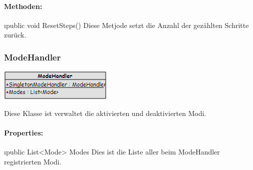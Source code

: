 \documentclass[../entwurf.tex]{subfiles}
\begin{document}
				\paragraph{Methoden:}
					\begin{itemize}
						\i{public void ResetSteps()} Diese Metjode setzt die Anzahl der gezählten Schritte zurück.
					\end{itemize}
			\subsubsection{ModeHandler}
				\begin{minipage}{0.45\textwidth}
					\includegraphics[width=\textwidth,height=\textheight,keepaspectratio]{../graphics/m_klassen/ModeHandler.png}
				\end{minipage}
				\begin{minipage}{0.55\textwidth}
					Diese Klasse ist verwaltet die aktivierten und deaktivierten Modi.
				\end{minipage}
				\paragraph{Properties:}
					\begin{itemize}
						\i{public List<Mode> Modes} Dies ist die Liste aller beim ModeHandler registrierten Modi.
					\end{itemize}
\end{document}
